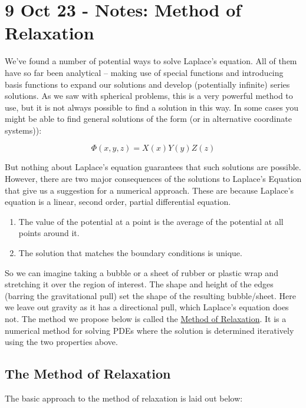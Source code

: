 \section{9 Oct 23 - Notes: Method of
Relaxation}\label{oct-23---notes-method-of-relaxation}

We've found a number of potential ways to solve Laplace's equation. All
of them have so far been analytical -- making use of special functions
and introducing basis functions to expand our solutions and develop
(potentially infinite) series solutions. As we saw with spherical
problems, this is a very powerful method to use, but it is not always
possible to find a solution in this way. In some cases you might be able
to find general solutions of the form (or in alternative coordinate
systems)):

\[\Phi(x,y,z)=X(x)Y(y)Z(z)\]

But nothing about Laplace's equation guarantees that such solutions are
possible. However, there are two major consequences of the solutions to
Laplace's Equation that give us a suggestion for a numerical approach.
These are because Laplace's equation is a linear, second order, partial
differential equation.

\begin{enumerate}
\def\labelenumi{\arabic{enumi}.}
\tightlist
\item
  The value of the potential at a point is the average of the potential
  at all points around it.
\item
  The solution that matches the boundary conditions is unique.
\end{enumerate}

So we can imagine taking a bubble or a sheet of rubber or plastic wrap
and stretching it over the region of interest. The shape and height of
the edges (barring the gravitational pull) set the shape of the
resulting bubble/sheet. Here we leave out gravity as it has a
directional pull, which Laplace's equation does not. The method we
propose below is called the
\href{https://en.wikipedia.org/wiki/Relaxation_(iterative_method)}{Method
of Relaxation}. It is a numerical method for solving PDEs where the
solution is determined iteratively using the two properties above.

\subsection{The Method of Relaxation}\label{the-method-of-relaxation}

The basic approach to the method of relaxation is laid out below:

